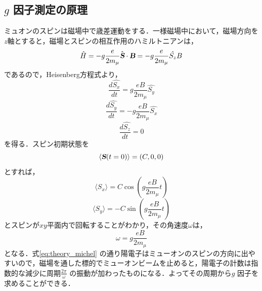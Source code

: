 \subsection{$g$ 因子測定の原理}
ミュオンのスピンは磁場中で歳差運動をする．一様磁場中において，磁場方向を$z$軸とすると，磁場とスピンの相互作用のハミルトニアンは，
\begin{equation}
\hat{H} = - g \frac{e}{2m_\mu} \hat {\textsl{\textbf {S}}} \cdot \textsl{\textbf {B}} = - g \frac{e}{2m_\mu}  \hat{S_z} B
\end{equation} 
であるので，Heisenberg方程式より，
\begin{equation}
\frac{d\hat{S_x}}{dt} =  g \frac{eB}{2m_\mu}\hat{S_y} 
\end{equation} 
\begin{equation}
\frac{d\hat{S_y}}{dt} = - g \frac{eB}{2m_\mu}\hat{S_x} 
\end{equation} 
\begin{equation}
\frac{d\hat{S_z}}{dt} = 0 
\end{equation} 
を得る．スピン初期状態を
\begin{equation}
\langle \textsl{\textbf {S}}(t=0)\rangle = (C,0,0)
\end{equation} 
とすれば，
\begin{equation}
\langle S_x \rangle= C\cos{(g\frac{eB}{2m_\mu}t)}
\end{equation}
\begin{equation}
\langle S_y \rangle= -C\sin{(g\frac{eB}{2m_\mu}t)}
\end{equation}
とスピンが$xy$平面内で回転することがわかり，その角速度$\omega$は，
\begin{equation}
\omega = g\frac{eB}{2m_\mu}
\end{equation}
となる．式\eqref{eq:theory_michel} の通り陽電子はミューオンのスピンの方向に出やすいので，磁場を通した標的でミューオンビームを止めると，陽電子の計数は指数的な減少に周期$\frac{2\pi}{\omega}$ の振動が加わったものになる．よってその周期から$g$ 因子を求めることができる．

